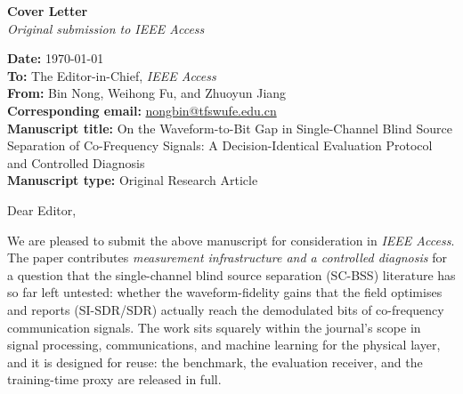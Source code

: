 \documentclass[11pt,a4paper]{article}
\begin{document}
\begin{center}
{\Large\bfseries Cover Letter}\\[4pt]
{\itshape Original submission to \emph{IEEE Access}}
\end{center}

\vspace{1em}

\noindent\textbf{Date:} \today\\[2pt]
\textbf{To:} The Editor-in-Chief, \emph{IEEE Access}\\
\textbf{From:} Bin Nong, Weihong Fu, and Zhuoyun Jiang\\
\textbf{Corresponding email:} \href{mailto:nongbin@tfswufe.edu.cn}{nongbin@tfswufe.edu.cn}\\
\textbf{Manuscript title:} On the Waveform-to-Bit Gap in Single-Channel
Blind Source Separation of Co-Frequency Signals: A Decision-Identical
Evaluation Protocol and Controlled Diagnosis\\
\textbf{Manuscript type:} Original Research Article

\vspace{1em}

\noindent Dear Editor,

\vspace{0.4em}

We are pleased to submit the above manuscript for consideration in
\emph{IEEE Access}. The paper contributes \emph{measurement
infrastructure and a controlled diagnosis} for a question that the
single-channel blind source separation (SC-BSS) literature has so far
left untested: whether the waveform-fidelity gains that the field
optimises and reports (SI-SDR/SDR) actually reach the demodulated bits
of co-frequency communication signals. The work sits squarely within
the journal's scope in signal processing, communications, and machine
learning for the physical layer, and it is designed for reuse: the
benchmark, the evaluation receiver, and the training-time proxy are
released in full.
\end{document}
